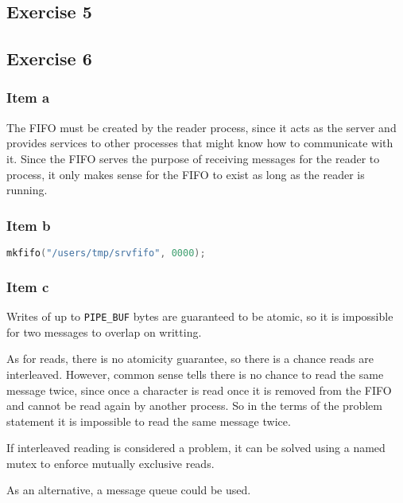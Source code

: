 {\subsection{Exercise 5}


\subsection{Exercise 6}
\subsubsection{Item a}
The FIFO must be created by the reader process, since it acts as the server and provides services to other processes that might know how to communicate with it. Since the FIFO serves the purpose of receiving messages for the reader to process, it only makes sense for the FIFO to exist as long as the reader is running.

\subsubsection{Item b}
\begin{lstlisting}[language=C]
mkfifo("/users/tmp/srvfifo", 0000);
\end{lstlisting}

\subsubsection{Item c}
Writes of up to \texttt{PIPE\_BUF} bytes are guaranteed to be atomic, so it is impossible for two messages to overlap on writting.\par
As for reads, there is no atomicity guarantee, so there is a chance reads are interleaved. However, common sense tells there is no chance to read the same message twice, since once a character is read once it is removed from the FIFO and cannot be read again by another process. So in the terms of the problem statement it is impossible to read the same message twice.\par
If interleaved reading is considered a problem, it can be solved using a named mutex to enforce mutually exclusive reads.\par
As an alternative, a message queue could be used.

}
